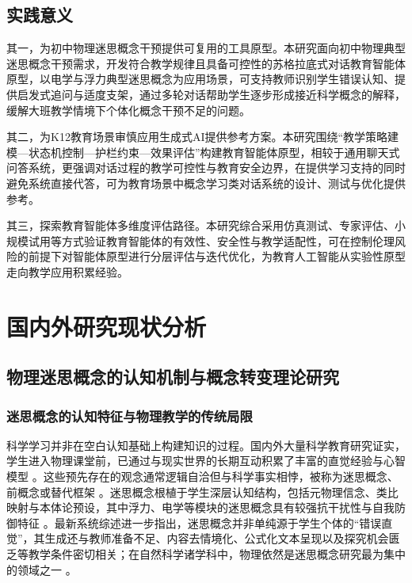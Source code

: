 \subsection{实践意义}

其一，为初中物理迷思概念干预提供可复用的工具原型。本研究面向初中物理典型迷思概念干预需求，开发符合教学规律且具备可控性的苏格拉底式对话教育智能体原型，以电学与浮力典型迷思概念为应用场景，可支持教师识别学生错误认知、提供启发式追问与适度支架，通过多轮对话帮助学生逐步形成接近科学概念的解释，缓解大班教学情境下个体化概念干预不足的问题。

其二，为K12教育场景审慎应用生成式AI提供参考方案。本研究围绕“教学策略建模—状态机控制—护栏约束—效果评估”构建教育智能体原型，相较于通用聊天式问答系统，更强调对话过程的教学可控性与教育安全边界，在提供学习支持的同时避免系统直接代答，可为教育场景中概念学习类对话系统的设计、测试与优化提供参考。

其三，探索教育智能体多维度评估路径。本研究综合采用仿真测试、专家评估、小规模试用等方式验证教育智能体的有效性、安全性与教学适配性，可在控制伦理风险的前提下对智能体原型进行分层评估与迭代优化，为教育人工智能从实验性原型走向教学应用积累经验。

\section{国内外研究现状分析}

\subsection{物理迷思概念的认知机制与概念转变理论研究}

\subsubsection{迷思概念的认知特征与物理教学的传统局限}

科学学习并非在空白认知基础上构建知识的过程。国内外大量科学教育研究证实，学生进入物理课堂前，已通过与现实世界的长期互动积累了丰富的直觉经验与心智模型 \citep{ref9}。这些预先存在的观念通常逻辑自洽但与科学事实相悖，被称为迷思概念、前概念或替代框架 \citep{ref4}。迷思概念根植于学生深层认知结构，包括元物理信念、类比映射与本体论预设，其中浮力、电学等模块的迷思概念具有较强抗干扰性与自我防御特征 \citep{ref6}。最新系统综述进一步指出，迷思概念并非单纯源于学生个体的“错误直觉”，其生成还与教师准备不足、内容去情境化、公式化文本呈现以及探究机会匮乏等教学条件密切相关；在自然科学诸学科中，物理依然是迷思概念研究最为集中的领域之一 \citep{guerrareyes2024misconceptions,olaogun2025predictors}。

